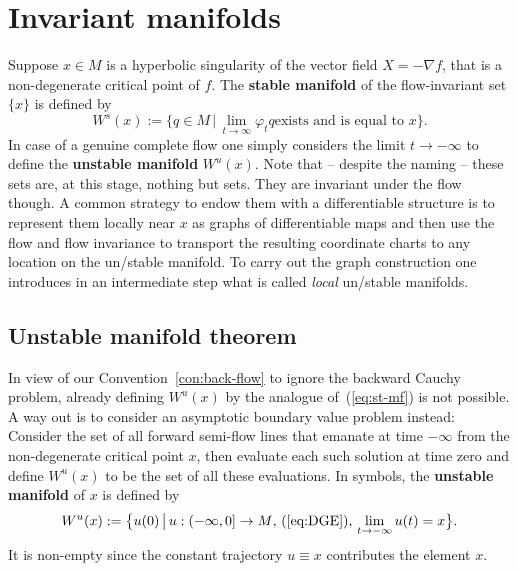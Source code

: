 \documentclass{article}
\begin{document}
\section{Invariant manifolds}\label{sec:inv-mfs}
Suppose $x\in M$ is a hyperbolic singularity of the
vector field $X=-\nabla f$, that is a non-degenerate critical point of $f$.
The {\bf stable manifold} of the flow-invariant set $\{x\}$ is defined by
\begin{equation}\label{eq:st-mf}
     W^s(x)
     :=\bigl\{q\in M\,\big|\,\text{$\lim_{t\to\infty}\varphi_tq$
     exists and is equal to $x$}\bigr\}.
\end{equation}
In case of a genuine complete flow one simply considers the limit $t\to-\infty$
to define the {\bf unstable manifold} $W^u(x)$.
Note that -- despite the naming -- these sets are, at this stage, nothing but  sets.
They are invariant under the flow though.
A common strategy to endow them with a differentiable
structure is to represent them locally near $x$ as
graphs of differentiable maps and then use the flow
and flow invariance to transport the resulting coordinate
charts to any location on the un/stable manifold.
To carry out the graph construction one introduces in an
intermediate step what is called \emph{local} un/stable manifolds.



\subsection*{Unstable manifold theorem}%
In view of our Convention~\ref{con:back-flow} to ignore the backward
Cauchy problem, already defining $W^u(x)$ by the analogue
of~(\ref{eq:st-mf}) is not possible. A way out is to consider an asymptotic
boundary value problem instead: Consider the set of
all forward semi-flow lines that emanate at time $-\infty$ from the non-degenerate
critical point $x$, then evaluate each such solution at time zero and
define $W^u(x)$ to be the set of all these evaluations. In symbols,
the {\bf unstable manifold} of $x$ is defined by
\begin{equation}\label {eq:unst-mf}
     W^u(x)
     :=\bigl\{u(0)\,\big|\,\text{$u:(-\infty,0]\to M$,
     (\ref{eq:DGE}),
     $\lim_{t\to-\infty} u(t)=x$}\bigr\}.
\end{equation}
It is non-empty since the constant trajectory $u\equiv x$
contributes the element $x$.
\end{document}
